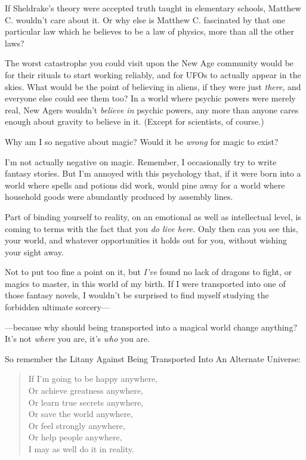 {
 If Sheldrake's theory were accepted truth taught
in elementary schools, Matthew C. wouldn't care about
it. Or why else is Matthew C. fascinated by that one particular law
which he believes to be a law of physics, more than all the other
laws?}

{
 The worst catastrophe you could visit upon the New Age community
would be for their rituals to start working reliably, and for UFOs to
actually appear in the skies. What would be the point of believing in
aliens, if they were just \textit{there}, and everyone else could see
them too? In a world where psychic powers were merely real, New Agers
wouldn't \textit{believe in} psychic powers, any more
than anyone cares enough about gravity to believe in it. (Except for
scientists, of course.)}

{
 Why am I so negative about magic? Would it be \textit{wrong} for
magic to exist?}

{
 I'm not actually negative on magic. Remember, I
occasionally try to write fantasy stories. But I'm
annoyed with this psychology that, if it were born into a world where
spells and potions did work, would pine away for a world where
household goods were abundantly produced by assembly lines.}

{
 Part of binding yourself to reality, on an emotional as well as
intellectual level, is coming to terms with the fact that you
\textit{do live here.} Only then can you see this, your world, and
whatever opportunities it holds out for you, without wishing your sight
away.}

{
 Not to put too fine a point on it, but
\textit{I've} found no lack of dragons to fight, or
magics to master, in this world of my birth. If I were transported into
one of those fantasy novels, I wouldn't be surprised to
find myself studying the forbidden ultimate sorcery---}

{
 {}---because why should being transported into a magical world
change anything? It's not \textit{where} you are,
it's \textit{who} you are.}

{
 So remember the Litany Against Being Transported Into An Alternate
Universe:\newline
}

\begin{verse}
 If I'm going to be happy anywhere,\\
 Or achieve greatness anywhere,\\
 Or learn true secrets anywhere,\\
 Or save the world anywhere,\\
 Or feel strongly anywhere,\\
 Or help people anywhere,\\
 I may as well do it in reality.\\
\end{verse}

